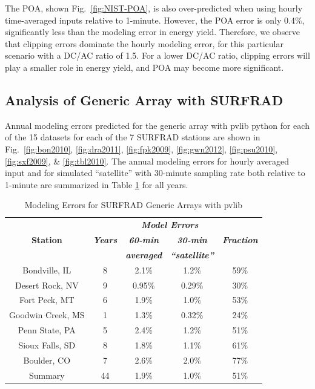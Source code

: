 \documentclass[conference]{IEEEtran}
\begin{document}
The POA, shown Fig.~\ref{fig:NIST-POA}, is also over-predicted when using hourly time-averaged inputs relative to 1-minute. However, the POA error is only 0.4\%, significantly less than the modeling error in energy yield. Therefore, we observe that clipping errors dominate the hourly modeling error, for this particular scenario with a DC/AC ratio of 1.5. For a lower DC/AC ratio, clipping errors will play a smaller role in energy yield, and POA may become more significant.

\subsection{Analysis of Generic Array with SURFRAD}
Annual modeling errors predicted for the generic array with pvlib python for each of the 15 datasets for each of the 7 SURFRAD stations are shown in Fig.~\ref{fig:bon2010}, \ref{fig:dra2011}, \ref{fig:fpk2009}, \ref{fig:gwn2012}, \ref{fig:psu2010}, \ref{fig:sxf2009}, \& \ref{fig:tbl2010}. The annual modeling errors for hourly averaged input and for simulated ``satellite'' with 30-minute sampling rate both relative to 1-minute are summarized in Table \ref{table:SURFRAD-summary} for all years.

\begin{table}[htbp]
\caption{Modeling Errors for SURFRAD Generic Arrays with pvlib}
\begin{center}
\begin{tabular}{|c|c|c|c|c|}
\hline
& & \multicolumn{2}{c|}{\textbf{\textit{Model Errors}}} & \\\cline{3-4}
\textbf{Station}& \textbf{\textit{Years}}& \textbf{\textit{60-min}} & \textbf{\textit{30-min}} & \textbf{\textit{Fraction}} \\
& & \textbf{\textit{averaged}} & \textbf{\textit{``satellite''}} &                                \\
\hline
Bondville, IL      & 8 & 2.1\% & 1.2\% & 59\% \\
Desert Rock, NV    & 9 & 0.95\%& 0.29\%& 30\% \\
Fort Peck, MT      & 6 & 1.9\% & 1.0\% & 53\% \\
Goodwin Creek, MS  & 1 & 1.3\% & 0.32\%& 24\% \\
Penn State, PA     & 5 & 2.4\% & 1.2\% & 51\% \\
Sioux Falls, SD    & 8 & 1.8\% & 1.1\% & 61\% \\
Boulder, CO        & 7 & 2.6\% & 2.0\% & 77\% \\
\hline
Summary& 44& 1.9\% & 1.0\% & 51\% \\
\hline
\end{tabular}
\label{table:SURFRAD-summary}
\end{center}
\end{table}
\end{document}
